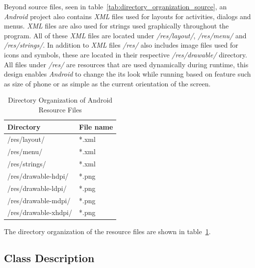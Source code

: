 Beyond source files, seen in table~\ref{tab:directory_organization_source}, an \textit{Android} project also contains \textit{XML} files used for layouts for activities, dialogs and menus. \textit{XML} files are also used for strings used graphically throughout the program. All of these \textit{XML} files are located under \textit{/res/layout/}, \textit{/res/menu/} and \textit{/res/strings/}. In addition to \textit{XML} files \textit{/res/} also includes image files used for icons and symbols, these are located in their respective \textit{/res/drawable/} directory. All files under \textit{/res/} are resources that are used dynamically during runtime, this design enables \textit{Android} to change the its look while running based on feature such as size of phone or as simple as the current orientation of the screen.
\begin{table}[hbt]
\begin{center}
    \begin{tabular}{ | l | l |}
    \hline
    \textbf{Directory} & \textbf{File name}\\ \hline
	/res/layout/ & *.xml\\ \hline
	/res/menu/ & *.xml\\ \hline
	/res/strings/ & *.xml\\ \hline
    /res/drawable-hdpi/ & *.png\\ \hline
    /res/drawable-ldpi/ & *.png\\ \hline
    /res/drawable-mdpi/ & *.png\\ \hline
    /res/drawable-xhdpi/ & *.png\\ \hline
    \end{tabular}
    \caption{Directory Organization of Android Resource Files}\label{tab:directory_organization_resource}
\end{center}
\end{table}
The directory organization of the resource files are shown in table~\ref{tab:directory_organization_resource}.


\subsection{Class Description}
\label{sec:class_description}

